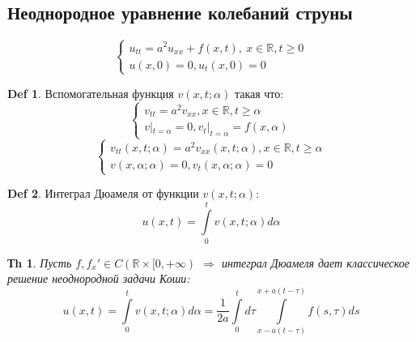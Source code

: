 \documentclass[14pt]{article}
\theoremstyle{plain}
\newtheorem{Thm}{Тh}
\theoremstyle{definition}
\newtheorem{Def}{Def}
\begin{document}
			\subsection{Неоднородное уравнение колебаний струны}
				\begin{equation*}
				\left\{ 
					\begin{array}{ll} 
						u_{tt} = a^2 u_{xx} + f(x,t), \ x \in \mathbb{R}, t \geq 0\\
						u(x,0) = 0, u_t(x,0) = 0  \end{array}\right.
				\end{equation*}
				\begin{Def}
					Вспомогательная функция $v(x,t; \alpha)$ такая что:
					\begin{equation*}
						\begin{cases}
							v_{tt} = a^2 v_{xx}, x \in \mathbb{R}, t \geq \alpha \\
							v|_{t = \alpha} = 0, v_t|_{t=\alpha} = f(x,\alpha)
						\end{cases}	
					\end{equation*}
					\begin{equation*}
						\begin{cases}
							v_{tt}(x,t; \alpha) = a^2 v_{xx}(x,t; \alpha), x\in \mathbb{R}, t \geq \alpha\\
							v(x, \alpha; \alpha) = 0, v_t(x, \alpha; \alpha) = 0
						\end{cases}
					\end{equation*}
				\end{Def}
				\begin{Def}
					Интеграл Дюамеля от функции $v(x,t; \alpha)$: 
					$$
						u(x,t) = \int\limits_0^{t} v(x, t; \alpha) d\alpha
					$$		
				\end{Def}
				\begin{Thm}
					Пусть $f, f_x' \in C(\mathbb{R} \times [0, +\infty)$ $\Rightarrow$ интеграл Дюамеля дает классическое решение неоднородной задачи Коши:
					$$
						u(x,t) = \int\limits_{0}^{t} v(x, t; \alpha) d\alpha = \dfrac{1}{2a} \int\limits_{0}^{t} d\tau \int\limits_{x-a(t-\tau)}^{x + a(t- \tau)} f(s, \tau) ds
					$$
				\end{Thm}
\end{document}

